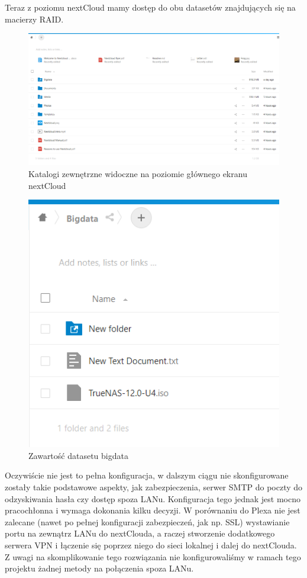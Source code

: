 \documentclass[12pt,a4paper]{article}
\newcommand{\<}{\langle}
\renewcommand{\>}{\rangle}
\theoremstyle{definition}
\begin{document}
Teraz z poziomu nextCloud mamy dostęp do obu datasetów znajdujących się na macierzy RAID.

\begin{figure}[H]
    \centering
    \includegraphics[width=\linewidth]{img/ss_cloud/40.png}
    \caption{Katalogi zewnętrzne widoczne na poziomie głównego ekranu nextCloud}
\end{figure}

\begin{figure}[H]
    \centering
    \includegraphics[]{img/ss_cloud/41.png}
    \caption{Zawartość datasetu bigdata}
\end{figure}

Oczywiście nie jest to pełna konfiguracja, w dalszym ciągu nie skonfigurowane zostały takie podstawowe aspekty, jak zabezpieczenia, serwer SMTP do poczty do odzyskiwania hasła czy dostęp spoza LANu. Konfiguracja tego jednak jest mocno pracochłonna i wymaga dokonania kilku decyzji. W porównaniu do Plexa nie jest zalecane (nawet po pełnej konfiguracji zabezpieczeń, jak np. SSL) wystawianie portu na zewnątrz LANu do nextClouda, a raczej stworzenie dodatkowego serwera VPN i łączenie się poprzez niego do sieci lokalnej i dalej do nextClouda. Z uwagi na skomplikowanie tego rozwiązania nie konfigurowaliśmy w ramach tego projektu żadnej metody na połączenia spoza LANu.
\end{document}
